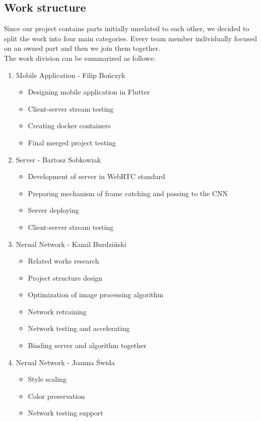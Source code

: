 \documentclass[../Main.tex]{subfiles}
\begin{document}
\subsection{Work structure}
Since our project contains parts initially unrelated to each other, we decided to split the work into four main categories. Every team member individually focused on an owned part and then we join them together. \\
The work division can be summarized as follows:
\begin{enumerate}
    \item Mobile Application - Filip Bończyk
        \begin{itemize}
            \item Designing mobile application in Flutter
            \item Client-server stream testing 
            \item Creating docker containers
            \item Final merged project testing
        \end{itemize}
    \item Server - Bartosz Sobkowiak
        \begin{itemize}
            \item Development of server in WebRTC standard
            \item Preparing mechanism of frame catching and passing to the CNN
            \item Server deploying
            \item Client-server stream testing 
        \end{itemize}
    \item Nerual Network - Kamil Burdziński
        \begin{itemize}
            \item Related works research
            \item Project structure design
            \item Optimization of image processing algorithm
            \item Network retraining
            \item Network testing and accelerating
            \item Binding server and algorithm together
        \end{itemize}
         \item Nerual Network - Joanna Świda
        \begin{itemize}
            \item Style scaling
            \item Color preservation
            \item Network testing support
        \end{itemize}
\end{enumerate}
\end{document}
